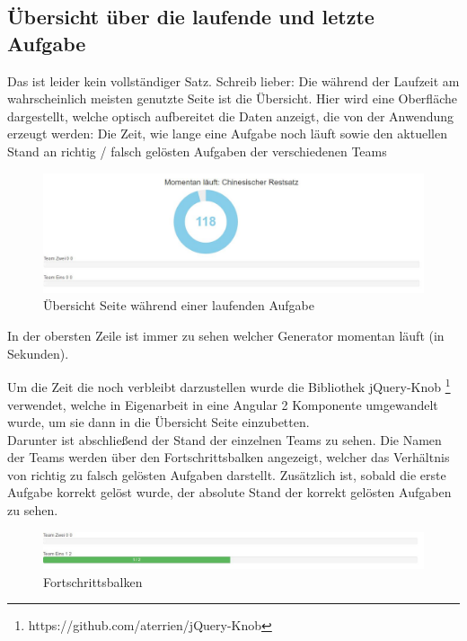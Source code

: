 \subsection{Übersicht über die laufende und letzte Aufgabe}

Das ist leider kein vollständiger Satz. Schreib lieber: Die während der Laufzeit am wahrscheinlich meisten genutzte Seite ist die Übersicht. Hier wird eine Oberfläche dargestellt, welche optisch aufbereitet die Daten anzeigt, die von der Anwendung erzeugt werden: Die Zeit, wie lange eine Aufgabe noch läuft sowie den aktuellen Stand an richtig / falsch gelösten Aufgaben der verschiedenen Teams \\
\begin{figure}[htp]     %
\centering
\includegraphics[width=1\textwidth]{bilder/Overview} 
\caption[Übersicht Seite während einer laufenden Aufgabe]{Übersicht Seite während einer laufenden Aufgabe}
\end{figure} 
In der obersten Zeile ist immer zu sehen welcher Generator momentan läuft (in Sekunden).

Um die Zeit die noch verbleibt darzustellen wurde die Bibliothek jQuery-Knob \footnote{https://github.com/aterrien/jQuery-Knob} verwendet, welche in Eigenarbeit in eine Angular 2 Komponente umgewandelt wurde, um sie dann in die Übersicht Seite einzubetten. \\

Darunter ist abschließend der Stand der einzelnen Teams zu sehen. Die Namen der Teams werden über den Fortschrittsbalken angezeigt, welcher das Verhältnis von richtig zu falsch gelösten Aufgaben darstellt. Zusätzlich ist, sobald die erste Aufgabe korrekt gelöst wurde, der absolute Stand der korrekt gelösten Aufgaben zu sehen. \\

\begin{figure}[htp]     %
\centering
\includegraphics[width=1\textwidth]{bilder/Bars} 
\caption[Fortschrittsbalken]{Fortschrittsbalken}
\end{figure} 

